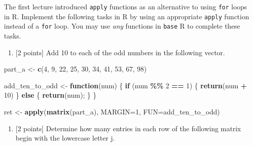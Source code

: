 \documentclass[
]{article}
\newenvironment{Shaded}{\begin{snugshade}}{\end{snugshade}}
\newcommand{\AttributeTok}[1]{\textcolor[rgb]{0.13,0.29,0.53}{#1}}
\newcommand{\ControlFlowTok}[1]{\textcolor[rgb]{0.13,0.29,0.53}{\textbf{#1}}}
\newcommand{\DecValTok}[1]{\textcolor[rgb]{0.00,0.00,0.81}{#1}}
\newcommand{\FunctionTok}[1]{\textcolor[rgb]{0.13,0.29,0.53}{\textbf{#1}}}
\newcommand{\NormalTok}[1]{#1}
\newcommand{\OtherTok}[1]{\textcolor[rgb]{0.56,0.35,0.01}{#1}}
\newcommand{\SpecialCharTok}[1]{\textcolor[rgb]{0.81,0.36,0.00}{\textbf{#1}}}
\providecommand{\tightlist}{%
  \setlength{\itemsep}{0pt}\setlength{\parskip}{0pt}}
\begin{document}
The first lecture introduced \texttt{apply} functions as an alternative
to using \texttt{for} loops in R. Implement the following tasks in R by
using an appropriate \texttt{apply} function instead of a \texttt{for}
loop. You may use \emph{any} functions in \texttt{base} R to complete
these tasks.

\begin{enumerate}
\def\labelenumi{(\alph{enumi})}
\tightlist
\item
  {[}2 points{]} Add 10 to each of the odd numbers in the following
  vector.
\end{enumerate}

\begin{Shaded}
\begin{Highlighting}[]
\NormalTok{part\_a }\OtherTok{\textless{}{-}} \FunctionTok{c}\NormalTok{(}\DecValTok{4}\NormalTok{, }\DecValTok{9}\NormalTok{, }\DecValTok{22}\NormalTok{, }\DecValTok{25}\NormalTok{, }\DecValTok{30}\NormalTok{, }\DecValTok{34}\NormalTok{, }\DecValTok{41}\NormalTok{, }\DecValTok{53}\NormalTok{, }\DecValTok{67}\NormalTok{, }\DecValTok{98}\NormalTok{)}

\NormalTok{add\_ten\_to\_odd }\OtherTok{\textless{}{-}} \ControlFlowTok{function}\NormalTok{(num) \{}
  \ControlFlowTok{if}\NormalTok{ (num }\SpecialCharTok{\%\%} \DecValTok{2} \SpecialCharTok{==} \DecValTok{1}\NormalTok{) \{}
    \FunctionTok{return}\NormalTok{(num }\SpecialCharTok{+} \DecValTok{10}\NormalTok{)}
\NormalTok{  \} }\ControlFlowTok{else}\NormalTok{ \{}
    \FunctionTok{return}\NormalTok{(num);}
\NormalTok{  \}}
\NormalTok{\}}

\NormalTok{ret }\OtherTok{\textless{}{-}} \FunctionTok{apply}\NormalTok{(}\FunctionTok{matrix}\NormalTok{(part\_a), }\AttributeTok{MARGIN=}\DecValTok{1}\NormalTok{, }\AttributeTok{FUN=}\NormalTok{add\_ten\_to\_odd)}
\end{Highlighting}
\end{Shaded}

\begin{enumerate}
\def\labelenumi{(\alph{enumi})}
\setcounter{enumi}{1}
\tightlist
\item
  {[}2 points{]} Determine how many entries in each row of the following
  matrix begin with the lowercase letter j.
\end{enumerate}
\end{document}
